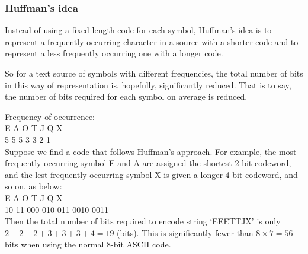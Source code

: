 \documentclass[a4]{beamer}
\begin{document}
\begin{frame}
\frametitle{Huffman’s idea}
Instead of using a fixed-length code for each symbol, Huffman’s idea is to
represent a frequently occurring character in a source with a shorter code and
to represent a less frequently occurring one with a longer code. 

So for a text
source of symbols with different frequencies, the total number of bits in this
way of representation is, hopefully, significantly reduced. That is to say, the
number of bits required for each symbol on average is reduced.
\end{frame}
\begin{frame}
Frequency of occurrence:\\
E A O T J Q X\\
5 5 5 3 3 2 1\\
Suppose we find a code that follows Huffman’s approach. For example, the
most frequently occurring symbol E and A are assigned the shortest 2-bit
codeword, and the lest frequently occurring symbol X is given a longer 4-bit
codeword, and so on, as below:\\
E A O T J Q X\\
10 11 000 010 011 0010 0011\\
Then the total number of bits required to encode string `EEETTJX’ is only
$2 + 2 + 2 + 3 + 3 + 3 + 4 = 19$ (bits). This is significantly fewer than
$8 \times 7 = 56$ bits when using the normal 8-bit ASCII code.
\end{frame}
\end{document}

